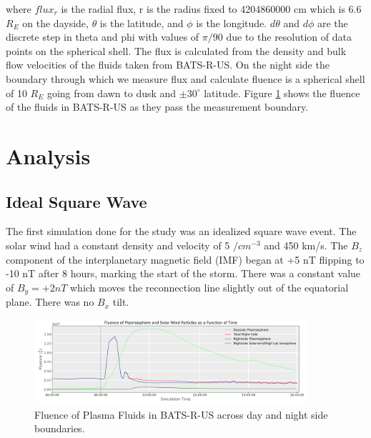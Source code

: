 \documentclass[utf8]{frontiersinFPHY_FAMS}
\begin{document}
where $flux_{r}$ is the radial flux, r is the radius fixed to 4204860000 cm which is 6.6 $R_{E}$ on the dayside, $\theta$ is the latitude, and $\phi$ is the longitude. $d\theta$ and $d\phi$ are the discrete step in theta and phi with values of $\pi/90$ due to the resolution of data points on the spherical shell. The flux is calculated from the density and bulk flow velocities of the fluids taken from BATS-R-US. On the night side the boundary through which we measure flux and calculate fluence is a spherical shell of 10 $R_{E}$ going from dawn to dusk and $\pm 30^{\circ}$ latitude. Figure \ref{fig:RESULT1} shows the fluence of the fluids in BATS-R-US as they pass the measurement boundary. 

\section{Analysis}

\subsection{Ideal Square Wave}

The first simulation done for the study was an idealized square wave event. The solar wind had a constant density and velocity of 5 $/cm^{-3}$ and 450 km/s. The $B_{z}$ component of the interplanetary magnetic field (IMF) began at +5 nT flipping to -10 nT after 8 hours, marking the start of the storm. There was a constant value of $B_{y}  = +2 nT$ which moves the reconnection line slightly out of the equatorial plane. There was no $B_{x}$ tilt. 

\begin{figure}[!ht]
\begin{center}
\includegraphics[width=0.9\textwidth]{FluenceAbs_LimCoLat.png}
\caption{Fluence of Plasma Fluids in BATS-R-US across day and night side boundaries.}
\label{fig:RESULT1}
\end{center}
\end{figure}
\end{document}
